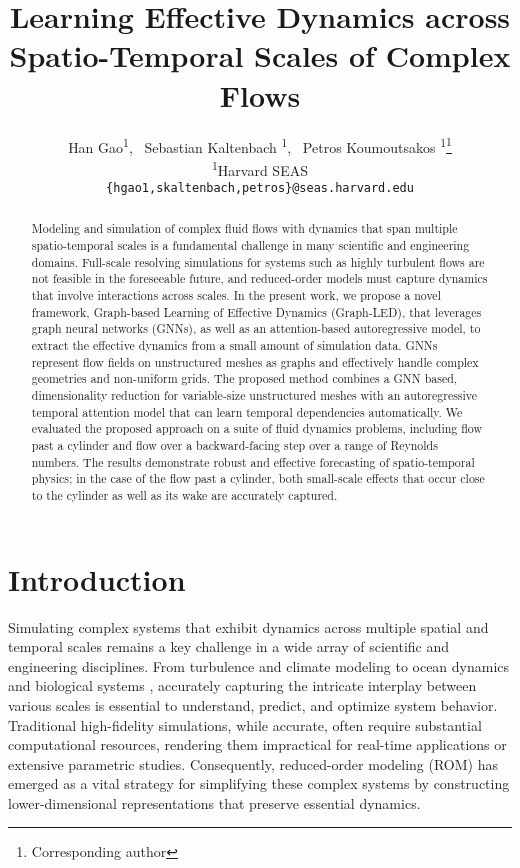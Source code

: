 \documentclass{article}
\title{Learning Effective Dynamics across Spatio-Temporal Scales of  Complex Flows}
\author{%
  Han Gao\textsuperscript{1}, ~Sebastian Kaltenbach \textsuperscript{1}, ~Petros Koumoutsakos \textsuperscript{1}\thanks{Corresponding author} \\
  \textsuperscript{1}Harvard SEAS \\
  \texttt{\{hgao1,skaltenbach,petros\}@seas.harvard.edu}
}
\begin{document}
\maketitle


\begin{abstract}
Modeling and simulation of complex fluid flows with dynamics that span multiple spatio-temporal scales is a fundamental challenge in many scientific and engineering domains. Full-scale resolving simulations for systems such as highly turbulent flows are not feasible in the foreseeable future, and reduced-order models must capture dynamics that involve interactions across scales. In the present work, we propose a novel framework, Graph-based Learning of Effective Dynamics (Graph-LED), that leverages graph neural networks (GNNs), as well as an attention-based autoregressive model, to extract the effective dynamics from a small amount of simulation data.  GNNs represent flow fields on unstructured meshes as graphs and effectively handle complex geometries and non-uniform grids. The proposed method combines a GNN based,  dimensionality reduction for variable-size unstructured meshes with an autoregressive temporal attention model that can learn temporal dependencies automatically. We evaluated the proposed approach on a suite of fluid dynamics problems, including flow past a cylinder and flow over a backward-facing step over a range of Reynolds numbers. The results demonstrate robust and effective forecasting of spatio-temporal physics; in the case of the flow past a cylinder, both small-scale effects that occur close to the cylinder as well as its wake are accurately captured. 
\end{abstract}


\section{Introduction}
Simulating complex systems that exhibit dynamics across multiple spatial and temporal scales remains a key challenge in a wide array of scientific and engineering disciplines. From turbulence \cite{wilcox1988multiscale} and climate modeling \cite{national2012exposure} to ocean dynamics \cite{mahadevan2016impact} and biological systems \cite{de2015multiscale}, accurately capturing the intricate interplay between various scales is essential to understand, predict, and optimize system behavior. Traditional high-fidelity simulations, while accurate, often require substantial computational resources, rendering them impractical for real-time applications or extensive parametric studies. Consequently, reduced-order modeling (ROM) has emerged as a vital strategy for simplifying these complex systems by constructing lower-dimensional representations that preserve essential dynamics.
\end{document}
